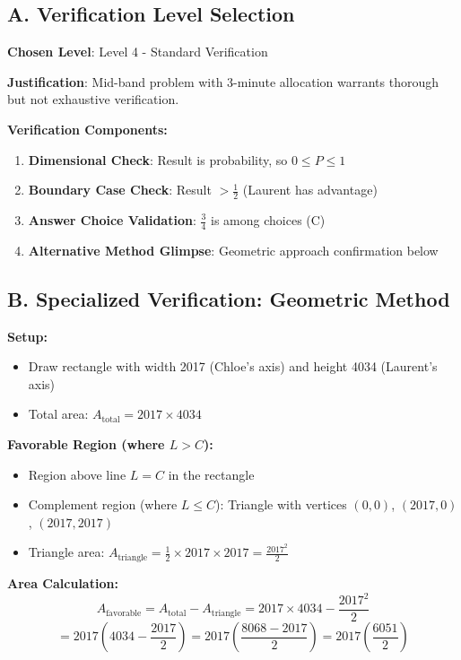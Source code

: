 \documentclass[]{article}
\begin{document}
\begin{verificationbox}
\subsection*{A. Verification Level Selection}
\textbf{Chosen Level}: Level 4 - Standard Verification

\textbf{Justification}: Mid-band problem with 3-minute allocation warrants thorough but not exhaustive verification.

\textbf{Verification Components:}
\begin{enumerate}
    \item \textbf{Dimensional Check}: Result is probability, so $0 \leq P \leq 1$ \checkmark
    \item \textbf{Boundary Case Check}: Result $> \frac{1}{2}$ (Laurent has advantage) \checkmark
    \item \textbf{Answer Choice Validation}: $\frac{3}{4}$ is among choices (C) \checkmark
    \item \textbf{Alternative Method Glimpse}: Geometric approach confirmation below
\end{enumerate}

\subsection*{B. Specialized Verification: Geometric Method}
\textbf{Setup:}
\begin{itemize}[leftmargin=*]
    \item Draw rectangle with width 2017 (Chloe's axis) and height 4034 (Laurent's axis)
    \item Total area: $A_{\text{total}} = 2017 \times 4034$
\end{itemize}

\textbf{Favorable Region (where $L > C$):}
\begin{itemize}[leftmargin=*]
    \item Region above line $L = C$ in the rectangle
    \item Complement region (where $L \leq C$): Triangle with vertices $(0,0)$, $(2017,0)$, $(2017,2017)$
    \item Triangle area: $A_{\text{triangle}} = \frac{1}{2} \times 2017 \times 2017 = \frac{2017^2}{2}$
\end{itemize}

\textbf{Area Calculation:}
\[A_{\text{favorable}} = A_{\text{total}} - A_{\text{triangle}} = 2017 \times 4034 - \frac{2017^2}{2}\]
\[= 2017 \left(4034 - \frac{2017}{2}\right) = 2017 \left(\frac{8068 - 2017}{2}\right) = 2017 \left(\frac{6051}{2}\right)\]


\end{verificationbox}
\end{document}
